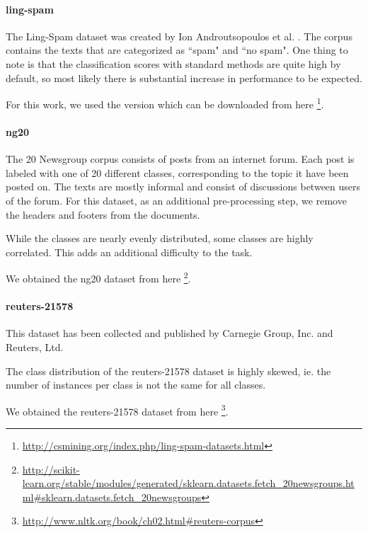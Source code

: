
\paragraph{ling-spam}
The Ling-Spam dataset was created by Ion Androutsopoulos et al. \cite{Androutsopoulos2000}.
The corpus contains the texts that are categorized as ``spam" and ``no spam".
One thing to note is that the classification scores with standard methods are quite high by default, so most likely there is substantial increase in performance to be expected.

For this work, we used the version which can be downloaded from here \footnote{\url{http://csmining.org/index.php/ling-spam-datasets.html}}.


\paragraph{ng20}
The 20 Newsgroup corpus \cite{Lang} consists of posts from an internet forum. Each post is labeled with one of 20 different classes, corresponding to the topic it have been posted on. The texts are mostly informal and consist of discussions between users of the forum.
For this dataset, as an additional pre-processing step, we remove the headers and footers from the documents.

While the classes are nearly evenly distributed, some classes are highly correlated. This adds an additional difficulty to the task.

We obtained the ng20 dataset from here \footnote{\url{http://scikit-learn.org/stable/modules/generated/sklearn.datasets.fetch_20newsgroups.html#sklearn.datasets.fetch_20newsgroups}}.

\paragraph{reuters-21578}
This dataset has been collected and published by Carnegie Group, Inc. and Reuters, Ltd.

The class distribution of the reuters-21578 dataset is highly skewed, ie. the number of instances per class is not the same for all classes. 


We obtained the reuters-21578 dataset from here
\footnote{\url{http://www.nltk.org/book/ch02.html#reuters-corpus}}.


